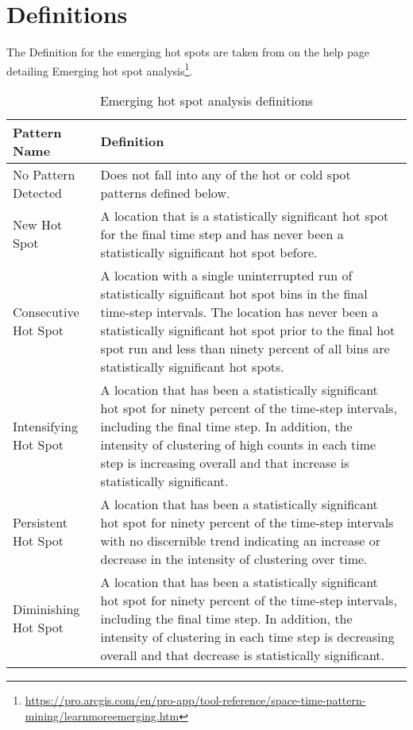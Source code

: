 \chapter{Definitions}
\label{Definition_appendix}

The Definition for the emerging hot spots are taken from \cite{Esri} on the help page detailing Emerging hot spot analysis\footnote{\url{https://pro.arcgis.com/en/pro-app/tool-reference/space-time-pattern-mining/learnmoreemerging.htm}}. 

\begin{longtable}{|l|p{10cm}|}
\caption[Emerging Hot Spot Analysis Definitions]{Emerging Hot Spot Analysis Definitions} 
\label{App:EmergingHotspotdef}
\endfirsthead
\caption[Emerging Hot Spot Analysis Definitions]{Emerging hot spot analysis definitions} 
\endhead
\hline
Pattern Name & Definition \\ \hline
No Pattern Detected & Does not fall into any of the hot or cold spot patterns defined below. \\ \hline
New Hot Spot & A location that is a statistically significant hot spot for the final time step and has never been a statistically significant hot spot before. \\ \hline
Consecutive Hot Spot & A location with a single uninterrupted run of statistically significant hot spot bins in the final time-step intervals. The location has never been a statistically significant hot spot prior to the final hot spot run and less than ninety percent of all bins are statistically significant hot spots. \\ \hline
Intensifying Hot Spot & A location that has been a statistically significant hot spot for ninety percent of the time-step intervals, including the final time step. In addition, the intensity of clustering of high counts in each time step is increasing overall and that increase is statistically significant. \\ \hline
Persistent Hot Spot & A location that has been a statistically significant hot spot for ninety percent of the time-step intervals with no discernible trend indicating an increase or decrease in the intensity of clustering over time. \\ \hline
Diminishing Hot Spot & A location that has been a statistically significant hot spot for ninety percent of the time-step intervals, including the final time step. In addition, the intensity of clustering in each time step is decreasing overall and that decrease is statistically significant. \\ \hline

\end{longtable}
